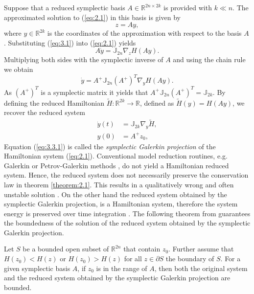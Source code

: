 Suppose that a reduced symplectic basis $A \in \mathbb R^{2n\times 2k}$ is provided with $k \ll n$. The approximated solution to (\ref{eq:2.1}) in this basis is given by
\begin{equation} \label{eq:3.1}
	z =Ay,
\end{equation}
where $y\in \mathbb R^{2k}$ is the coordinates of the approximation with respect to the basis $A$. Substituting (\ref{eq:3.1}) into (\ref{eq:2.1}) yields
\begin{equation} \label{eq:3.2}
	A \dot y = \mathbb{J}_{2n} \nabla_{z} H(A y).
\end{equation}
Multiplying both sides with the symplectic inverse of $A$ and using the chain rule we obtain
\begin{equation} \label{eq:3.3}
	\dot y = A^+ \mathbb{J}_{2n} (A^+)^T \nabla_{y} H(A y).
\end{equation}
As $(A^+)^T$ is a symplectic matrix it yields that $A^+ \mathbb{J}_{2n} (A^+)^T = \mathbb{J}_{2k}$. By defining the reduced Hamiltonian $\tilde H : \mathbb{R}^{2k} \to \mathbb R$, defined as $\tilde H (y) = H(Ay)$, we recover the reduced system
\begin{equation} \label{eq:3.3.1}
	\begin{aligned}
	\dot {y}(t) &= \mathbb J_{2k} \nabla_{y} \tilde H, \\
	y(0) &= A^+ z_0,
	\end{aligned}
\end{equation}
Equation (\ref{eq:3.3.1}) is called the \emph{symplectic Galerkin projection} \cite{Peng:2014di} of the Hamiltonian system (\ref{eq:2.1}). Conventional model reduction routines, e.g. Galerkin or Petrov-Galerkin methods \cite{hesthaven2015certified,quarteroni2015reduced}, do not yield a Hamiltonian reduced system. Hence, the reduced system does not necessarily preserve the conservation law in theorem \ref{theorem:2.1}. This results in a qualitatively wrong and often unstable solution \cite{Peng:2014di}. On the other hand the reduced system obtained by the symplectic Galerkin projection, is a Hamiltonian system, therefore the system energy is preserved over time integration \cite{Peng:2014di}. The following theorem from \cite{Peng:2014di} guarantees the boundedness of the solution of the reduced system obtained by the symplectic Galerkin projection.

\begin{theorem}
\cite{bhatia2002stability} Let $S$ be a bounded open subset of $\mathbb R^{2n}$ that contain $z_0$. Further assume that $H(z_0)<H(z)$ or $H(z_0)>H(z)$ for all $z\in \partial S$ the boundary of $S$. For a given symplectic basis $A$, if $z_0$ is in the range of $A$, then both the original system and the reduced system obtained by the symplectic Galerkin projection are bounded.
\end{theorem}

